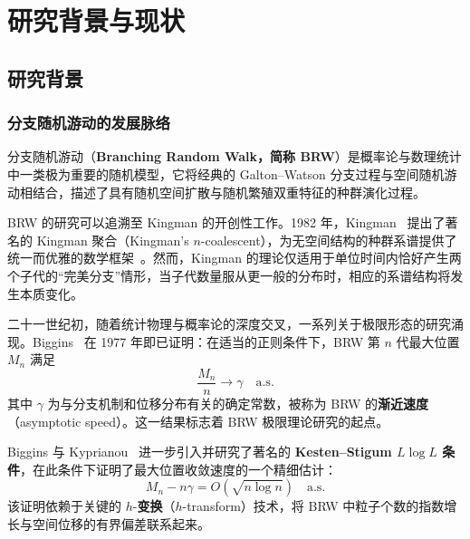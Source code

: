 \chapter{研究背景与现状}
\label{chap:background}

\section{研究背景}
\label{sec:background}

\subsection{分支随机游动的发展脉络}
\label{ssec:brw_history}

分支随机游动（\textbf{Branching Random Walk，简称 BRW}）是概率论与数理统计中一类极为重要的随机模型，它将经典的 Galton--Watson 分支过程与空间随机游动相结合，描述了具有随机空间扩散与随机繁殖双重特征的种群演化过程。

BRW 的研究可以追溯至 Kingman 的开创性工作。1982 年，Kingman~\cite{kingman1982coalescent} 提出了著名的 Kingman 聚合（Kingman's $n$-coalescent），为无空间结构的种群系谱提供了统一而优雅的数学框架~\cite{aldous1999moments}。然而，Kingman 的理论仅适用于单位时间内恰好产生两个子代的``完美分支''情形，当子代数量服从更一般的分布时，相应的系谱结构将发生本质变化。

二十一世纪初，随着统计物理与概率论的深度交叉，一系列关于极限形态的研究涌现。Biggins~\cite{biggins1977} 在 1977 年即已证明：在适当的正则条件下，BRW 第 $n$ 代最大位置 $M_n$ 满足
\begin{equation}
\label{eq:biggins_result}
\frac{M_n}{n} \longrightarrow \gamma \quad \text{a.s.}
\end{equation}
其中 $\gamma$ 为与分支机制和位移分布有关的确定常数，被称为 BRW 的\textbf{渐近速度}（asymptotic speed）。这一结果标志着 BRW 极限理论研究的起点。

Biggins 与 Kyprianou~\cite{biggins2004} 进一步引入并研究了著名的 \textbf{Kesten--Stigum $L\log L$ 条件}，在此条件下证明了最大位置收敛速度的一个精细估计：
\[
M_n - n\gamma = O(\sqrt{n\log n}) \quad \text{a.s.}
\]
该证明依赖于关键的 $h$-\textbf{变换}（$h$-transform）技术，将 BRW 中粒子个数的指数增长与空间位移的有界偏差联系起来。

